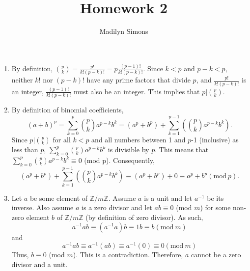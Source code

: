 \documentclass{article}
\title{Homework 2}
\author{Madilyn Simons}
\date{}
\begin{document}
\maketitle

\begin{enumerate}

\item By definition, $\binom{p}{k} = \frac{p!}{k!(p-k)!} = p\frac{(p-1)!}{k!(p-k)!}$.
Since $k < p$ and $p-k < p$, neither $k!$ nor $(p-k)!$ have any prime factors that divide $p$,
and $\frac{p!}{k!(p-k)!}$ is an integer, $\frac{(p-1)!}{k!(p-k)!}$ must also be an integer.
This implies that $p \vert \binom{p}{k}$.

\item By definition of binomial coefficients,
\[
(a+b)^p = \sum_{k=0}^{p} \binom{p}{k} a^{p-k}b^k = (a^p + b^p) +
\sum_{k=1}^{p-1} (\binom{p}{k} a^{p-k}b^k).
\]
Since $p \vert \binom{p}{k}$ for all $k < p$ and all numbers between 1 and $p$-1
(inclusive) as less than $p$, $\sum_{k=0}^{p} \binom{p}{k} a^{p-k}b^k$ is divisible
by $p$.  This means that $\sum_{k=0}^{p} \binom{p}{k} a^{p-k}b^k \equiv 0$ (mod p).
Consequently,
\[
(a^p + b^p) + \sum_{k=1}^{p-1} (\binom{p}{k} a^{p-k}b^k) \equiv (a^p + b^p) + 0
\equiv a^p + b ^p (\textrm{mod}\ p).
\]

\item Let $a$ be some element of $\mathbb{Z}/m\mathbb{Z}$.  Assume $a$ is a unit
and let $a^{-1}$ be its inverse.  Also assume $a$ is a zero divisor and let
$ab \equiv 0$ (mod $m$) for some non-zero element $b$ of $\mathbb{Z}/m\mathbb{Z}$
(by definition of zero divisor).
As such,
\[
a^{-1}ab \equiv (a^{-1}a)b \equiv 1b \equiv b (\textrm{mod}\ m)
\]
and
\[
a^{-1}ab \equiv a^{-1}(ab) \equiv a^{-1}(0) \equiv 0 (\textrm{mod}\ m)
\]
Thus, $b \equiv 0$ (mod $m$).  This is a contradiction.  Therefore, $a$ cannot
be a zero divisor and a unit.

\end{enumerate}
\end{document}
